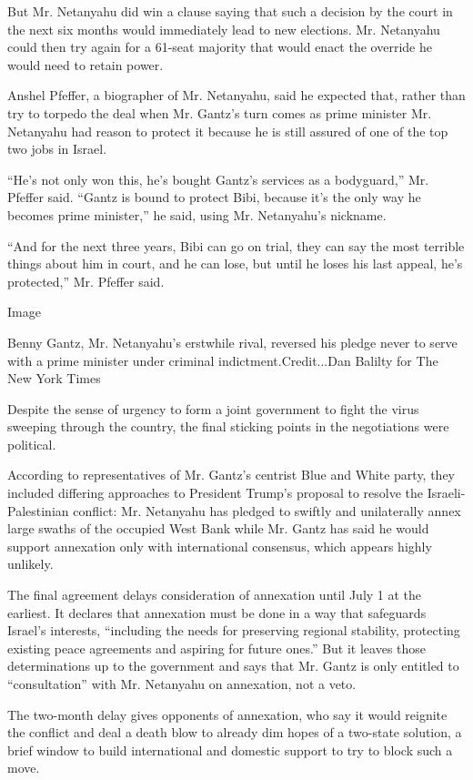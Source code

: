 But Mr. Netanyahu did win a clause saying that such a decision by the
court in the next six months would immediately lead to new elections.
Mr. Netanyahu could then try again for a 61-seat majority that would
enact the override he would need to retain power.

Anshel Pfeffer, a biographer of Mr. Netanyahu, said he expected that,
rather than try to torpedo the deal when Mr. Gantz's turn comes as prime
minister Mr. Netanyahu had reason to protect it because he is still
assured of one of the top two jobs in Israel.

``He's not only won this, he's bought Gantz's services as a bodyguard,''
Mr. Pfeffer said. ``Gantz is bound to protect Bibi, because it's the
only way he becomes prime minister,'' he said, using Mr. Netanyahu's
nickname.

``And for the next three years, Bibi can go on trial, they can say the
most terrible things about him in court, and he can lose, but until he
loses his last appeal, he's protected,'' Mr. Pfeffer said.

Image

Benny Gantz, Mr. Netanyahu's erstwhile rival, reversed his pledge never
to serve with a prime minister under criminal indictment.Credit...Dan
Balilty for The New York Times

Despite the sense of urgency to form a joint government to fight the
virus sweeping through the country, the final sticking points in the
negotiations were political.

According to representatives of Mr. Gantz's centrist Blue and White
party, they included differing approaches to President Trump's proposal
to resolve the Israeli-Palestinian conflict: Mr. Netanyahu has pledged
to swiftly and unilaterally annex large swaths of the occupied West Bank
while Mr. Gantz has said he would support annexation only with
international consensus, which appears highly unlikely.

The final agreement delays consideration of annexation until July 1 at
the earliest. It declares that annexation must be done in a way that
safeguards Israel's interests, ``including the needs for preserving
regional stability, protecting existing peace agreements and aspiring
for future ones.'' But it leaves those determinations up to the
government and says that Mr. Gantz is only entitled to ``consultation''
with Mr. Netanyahu on annexation, not a veto.

The two-month delay gives opponents of annexation, who say it would
reignite the conflict and deal a death blow to already dim hopes of a
two-state solution, a brief window to build international and domestic
support to try to block such a move.

